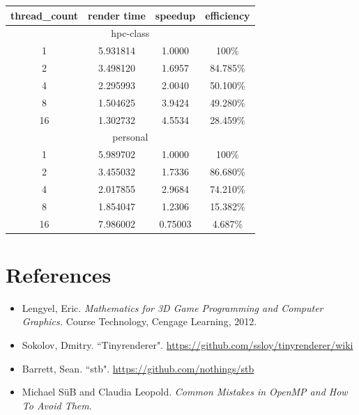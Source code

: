 \documentclass[12pt]{article}
\begin{document}
\bigbreak
\begin{center}
	\begin{tabular}{|c|c|c|c|}
		\hline
		thread\_count & render time & speedup & efficiency \\ \hline \hline
		\multicolumn{4}{|c|}{hpc-class } \\ \hline
		1 & 5.931814 & 1.0000 & 100\% \\ \hline
		2 & 3.498120 & 1.6957 & 84.785\% \\ \hline
		4 & 2.295993 & 2.0040 & 50.100\% \\ \hline
		8 & 1.504625 & 3.9424 & 49.280\% \\ \hline
		16 & 1.302732 & 4.5534 & 28.459\% \\ \hline
		\multicolumn{4}{|c|}{personal } \\ \hline
		1 & 5.989702 & 1.0000 & 100\% \\ \hline
		2 & 3.455032 & 1.7336 & 86.680\% \\ \hline
		4 & 2.017855 & 2.9684 & 74.210\% \\ \hline
		8 & 1.854047 & 1.2306 & 15.382\% \\ \hline
		16 & 7.986002 & 0.75003 & 4.687\% \\ \hline
	\end{tabular}
\end{center}

\clearpage
\section*{References}

\begin{itemize}
	\item Lengyel, Eric. \textit{Mathematics for 3D Game Programming and Computer Graphics.} Course Technology,
Cengage Learning, 2012.
	\item Sokolov, Dmitry. ``Tinyrenderer". \url{https://github.com/ssloy/tinyrenderer/wiki}
	\item Barrett, Sean. ``stb". \url{https://github.com/nothings/stb}
	\item Michael S\"uB and Claudia Leopold. \textit{Common Mistakes in OpenMP and How To Avoid Them}.
\end{itemize}
\end{document}
